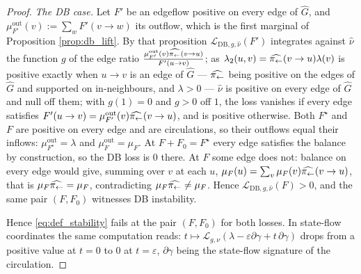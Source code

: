 \begin{proof}
\emph{The DB case.} Let $F'$ be an edgeflow positive on every edge of $\widehat G$, and $\mu^{\mathrm{out}}_{F'}(v):=\sum_wF'(v\rightarrow w)$ its outflow, which is the first marginal of Proposition \ref{prop:db_lift}. By that proposition $\mathcal L_{\mathrm{DB},g,\widehat\nu}(F')$ integrates against $\widehat\nu$ the function $g$ of the edge ratio $\frac{\mu^{\mathrm{out}}_{F'}(v)\widehat{\pi_{\leftarrow}}(v\rightarrow u)}{F'(u\rightarrow v)}$; as $\lambda_2(u,v)=\widehat{\pi_{\leftarrow}}(v\rightarrow u)\lambda(v)$ is positive exactly when $u\rightarrow v$ is an edge of $\widehat G$ --- $\widehat{\pi_{\leftarrow}}$ being positive on the edges of $\widehat G$ and supported on in-neighbours, and $\lambda>0$ --- $\widehat\nu$ is positive on every edge of $\widehat G$ and null off them; with $g(1)=0$ and $g>0$ off $1$, the loss vanishes if every edge satisfies $F'(u\rightarrow v)=\mu^{\mathrm{out}}_{F'}(v)\widehat{\pi_{\leftarrow}}(v\rightarrow u)$, and is positive otherwise. Both $F^\star$ and $F$ are positive on every edge and are circulations, so their outflows equal their inflows: $\mu^{\mathrm{out}}_{F^\star}=\lambda$ and $\mu^{\mathrm{out}}_F=\mu_F$. At $F+F_0=F^\star$ every edge satisfies the balance by construction, so the DB loss is $0$ there. At $F$ some edge does not: balance on every edge would give, summing over $v$ at each $u$, $\mu_F(u)=\sum_v\mu_F(v)\widehat{\pi_{\leftarrow}}(v\rightarrow u)$, that is $\mu_F\widehat{\pi_{\leftarrow}}=\mu_F$, contradicting $\mu_F\widehat{\pi_{\leftarrow}}\neq\mu_F$. Hence $\mathcal L_{\mathrm{DB},g,\widehat\nu}(F)>0$, and the same pair $(F,F_0)$ witnesses DB instability.

Hence \eqref{eq:def_stability} fails at the pair $(F,F_0)$ for both losses. In state-flow coordinates the same computation reads: $t\mapsto\mathcal L_{g,\nu}(\lambda-\varepsilon\partial\gamma+t\,\partial\gamma)$ drops from a positive value at $t=0$ to $0$ at $t=\varepsilon$, $\partial\gamma$ being the state-flow signature of the circulation.
\end{proof}

